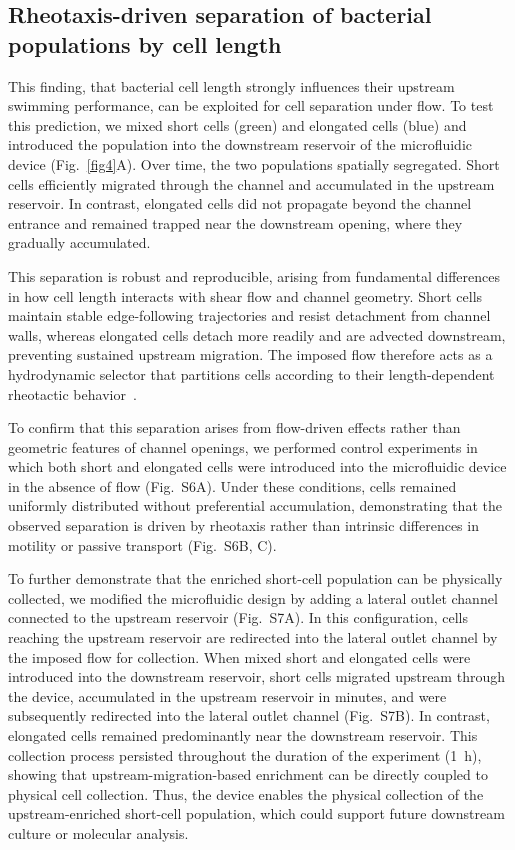 \documentclass[twoside,twocolumn,9pt]{article}
\begin{document}
    \subsection*{Rheotaxis-driven separation of bacterial populations by cell length}
    
    This finding, that bacterial cell length strongly influences their upstream swimming performance, can be exploited for cell separation under flow. 
    To test this prediction, we mixed short cells (green) and elongated cells (blue) and introduced the population into the downstream reservoir of the microfluidic device (Fig.~\ref{fig4}A). 
    Over time, the two populations spatially segregated. 
    Short cells efficiently migrated through the channel and accumulated in the upstream reservoir. 
    In contrast, elongated cells did not propagate beyond the channel entrance and remained trapped near the downstream opening, where they gradually accumulated.
    
    This separation is robust and reproducible, arising from fundamental differences in how cell length interacts with shear flow and channel geometry. Short cells maintain stable edge-following trajectories and resist detachment from channel walls, whereas elongated cells detach more readily and are advected downstream, preventing sustained upstream migration. The imposed flow therefore acts as a hydrodynamic selector that partitions cells according to their length-dependent rheotactic behavior~\cite{Liu2022-uv,Masaeli2012-pq,Tang2022-da,Cruz2019-yx,Zhang2023-ww}.

    To confirm that this separation arises from flow-driven effects rather than geometric features of channel openings, we performed control experiments in which both short and elongated cells were introduced into the microfluidic device in the absence of flow (Fig.~S6A). Under these conditions, cells remained uniformly distributed without preferential accumulation, demonstrating that the observed separation is driven by rheotaxis rather than intrinsic differences in motility or passive transport (Fig.~S6B, C).

    To further demonstrate that the enriched short-cell population can be physically collected, we modified the microfluidic design by adding a lateral outlet channel connected to the upstream reservoir (Fig.~S7A). In this configuration, cells reaching the upstream reservoir are redirected into the lateral outlet channel by the imposed flow for collection. When mixed short and elongated cells were introduced into the downstream reservoir, short cells migrated upstream through the device, accumulated in the upstream reservoir in minutes, and were subsequently redirected into the lateral outlet channel (Fig.~S7B). In contrast, elongated cells remained predominantly near the downstream reservoir. This collection process persisted throughout the duration of the experiment (\SI{1}{\hour}), showing that upstream-migration-based enrichment can be directly coupled to physical cell collection. Thus, the device enables the physical collection of the upstream-enriched short-cell population, which could support future downstream culture or molecular analysis.
    
\end{document}
